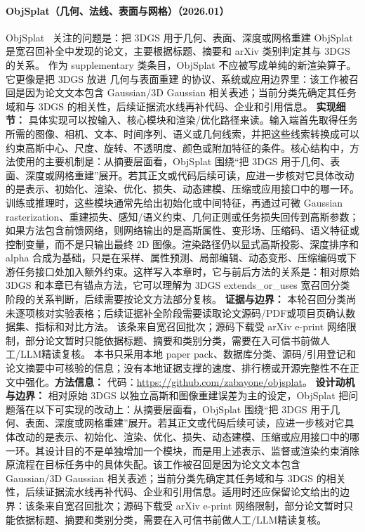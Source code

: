 \paragraph{ObjSplat（几何、法线、表面与网格）（2026.01）}
ObjSplat~\cite{2601_06997} 关注的问题是：把 3DGS 用于几何、表面、深度或网格重建 ObjSplat 是宽召回补全中发现的论文，主要根据标题、摘要和 arXiv 类别判定其与 3DGS 的关系。
作为 supplementary 类条目，ObjSplat 不应被写成单纯的新渲染算子。它更像是把 3DGS 放进 几何与表面重建 的协议、系统或应用边界里：该工作被召回是因为论文文本包含 Gaussian/3D Gaussian 相关表述；当前分类先确定其任务域和与 3DGS 的相关性，后续证据流水线再补代码、企业和引用信息。
\textbf{实现细节：} 具体实现可以按输入、核心模块和渲染/优化路径来读。输入端首先取得任务所需的图像、相机、文本、时间序列、语义或几何线索，并把这些线索转换成可以约束高斯中心、尺度、旋转、不透明度、颜色或附加特征的条件。核心结构中，方法使用的主要机制是：从摘要层面看，ObjSplat 围绕“把 3DGS 用于几何、表面、深度或网格重建”展开。若其正文或代码后续可读，应进一步核对它具体改动的是表示、初始化、渲染、优化、损失、动态建模、压缩或应用接口中的哪一环。 训练或推理时，这些模块通常先给出初始化或中间特征，再通过可微 Gaussian rasterization、重建损失、感知/语义约束、几何正则或任务损失回传到高斯参数；如果方法包含前馈网络，则网络输出的是高斯属性、变形场、压缩码、语义特征或控制变量，而不是只输出最终 2D 图像。渲染路径仍以显式高斯投影、深度排序和 alpha 合成为基础，只是在采样、属性预测、局部编辑、动态变形、压缩编码或下游任务接口处加入额外约束。这样写入本章时，它与前后方法的关系是：相对原始 3DGS 和本章已有锚点方法，它可以理解为 3DGS extends\_or\_uses 宽召回分类阶段的关系判断，后续需要按论文方法部分复核。
\textbf{证据与边界：} 本轮召回分类尚未逐项核对实验表格；后续证据补全阶段需要读取论文源码/PDF或项目页确认数据集、指标和对比方法。 该条来自宽召回批次；源码下载受 arXiv e-print 网络限制，部分论文暂时只能依据标题、摘要和类别分类，需要在入可信书前做人工/LLM精读复核。 本书只采用本地 paper pack、数据库分类、源码/引用登记和论文摘要中可核验的信息；没有本地证据支撑的速度、排行榜或开源完整性不在正文中强化。\textbf{方法信息：} 代码：\url{https://github.com/zabayone/objsplat}。
\textbf{设计动机与边界：} 相对原始 3DGS 以独立高斯和图像重建误差为主的设定，ObjSplat 把问题落在以下可实现的改动上：从摘要层面看，ObjSplat 围绕“把 3DGS 用于几何、表面、深度或网格重建”展开。若其正文或代码后续可读，应进一步核对它具体改动的是表示、初始化、渲染、优化、损失、动态建模、压缩或应用接口中的哪一环。其设计目的不是单独增加一个模块，而是用上述表示、监督或渲染约束消除原流程在目标任务中的具体失配。该工作被召回是因为论文文本包含 Gaussian/3D Gaussian 相关表述；当前分类先确定其任务域和与 3DGS 的相关性，后续证据流水线再补代码、企业和引用信息。适用时还应保留论文给出的边界：该条来自宽召回批次；源码下载受 arXiv e-print 网络限制，部分论文暂时只能依据标题、摘要和类别分类，需要在入可信书前做人工/LLM精读复核。
